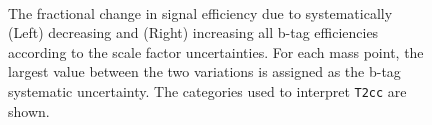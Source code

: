 \begin{figure}[h!]
\begin{center}
{    }  
    \\
    \caption{\label{fig:sms-btag-t2cc}The fractional change in signal
      efficiency due to systematically (Left) decreasing and (Right)
      increasing all b-tag efficiencies according to the scale factor
      uncertainties. For each mass point, the largest value between the 
      two variations is assigned as the b-tag systematic uncertainty. 
      The categories used to interpret \texttt{T2cc} are shown.}
  \end{center}
\end{figure}



